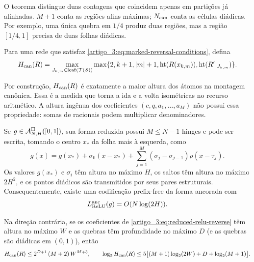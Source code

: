 O teorema distingue duas contagens que coincidem apenas em partições já
alinhadas. $M+1$ conta as regiões afins máximas; $N_{\rm can}$ conta as células
diádicas. Por exemplo, uma única quebra em $1/4$ produz duas regiões, mas a
região $[1/4,1]$ precisa de duas folhas diádicas.

\begin{definition}\label{map:artigo_3:5.3}
\label{artigo_3:def:canonical-network-height}
Para uma rede que satisfaz \eqref{artigo_3:eq:marked-reversal-conditions}, defina
\begin{equation}
 H_{\rm can}(R)=
 \max_{J_{k,m}\in\operatorname{leaf}(\mathcal T(S))}
 \max\{2,k+1,|m|+1,\operatorname{ht}(R(x_{k,m})),\operatorname{ht}(R'|_{J_{k,m}})\}.
 \label{artigo_3:eq:canonical-network-height}
\end{equation}
\end{definition}

Por construção, $H_{\rm can}(R)$ é exatamente a maior altura dos átomos na
montagem canônica. Essa é a medida que torna a ida e a volta isométricas no
recurso aritmético. A altura ingênua dos coeficientes
$(c,q,a_1,\ldots,a_M)$ não possui essa propriedade: somas de racionais podem
multiplicar denominadores.

\begin{proposition}\label{map:artigo_3:5.4}
\label{artigo_3:prop:anchored-relu-code}
Se $g\in\mathcal{A}^\square_{N,H}([0,1])$, sua forma reduzida possui
$M\le N-1$ hinges e pode ser escrita, tomando o centro $x_*$ da folha mais à
esquerda, como
\begin{equation}
 g(x)=g(x_*)+\sigma_0(x-x_*)
      +\sum_{j=1}^{M}(\sigma_j-\sigma_{j-1})\rho(x-\tau_j).
 \label{artigo_3:eq:anchored-relu-form}
\end{equation}
Os valores $g(x_*)$ e $\sigma_i$ têm altura no máximo $H$, os saltos têm
altura no máximo $2H^2$, e os pontos diádicos são transmitidos por seus pares
estruturais. Consequentemente, existe uma codificação prefix-free da forma
ancorada com
\begin{equation}
 L_{\rm ReLU}^{\rm anc}(g)=O(N\log(2H)).
 \label{artigo_3:eq:anchored-network-bits}
\end{equation}

Na direção contrária, se os coeficientes de
\eqref{artigo_3:eq:reduced-relu-reverse} têm altura no máximo $W$ e as quebras têm
profundidade no máximo $D$ (e as quebras são diádicas em $(0,1)$), então
\begin{equation}
 H_{\rm can}(R)\le 2^{D+1}\,(M+2)\,W^{M+3},
 \qquad
 \log_2 H_{\rm can}(R)
 \le 5\bigl[(M+1)\log_2(2W)+D+\log_2(M+1)\bigr].
 \label{artigo_3:eq:reverse-height-bit-bound}
\end{equation}
\end{proposition}

